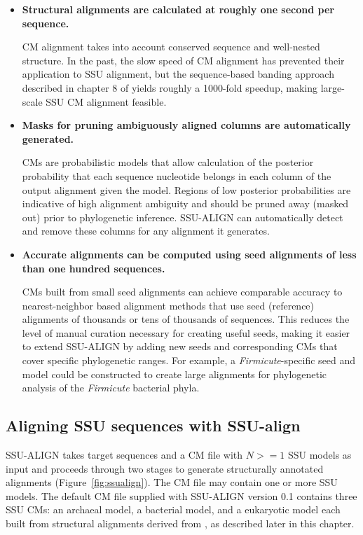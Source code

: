 \begin{itemize}

\item \textbf{Structural alignments are calculated at roughly one
  second per sequence.}  

  CM alignment takes into account conserved sequence and well-nested
  structure. In the past, the slow speed of CM alignment has prevented
  their application to SSU alignment, but the sequence-based banding
  approach described in chapter 8 of \cite{Nawrocki09b} yields roughly a 1000-fold speedup,
  making large-scale SSU CM alignment feasible.

\item \textbf{Masks for pruning ambiguously aligned columns are
  automatically generated.}
  
  CMs are probabilistic models that allow calculation of the posterior
  probability that each sequence nucleotide belongs in each column of the
  output alignment given the model. Regions of low posterior
  probabilities are indicative of high alignment ambiguity and
  should be pruned away (masked out) prior to phylogenetic
  inference. SSU-ALIGN can automatically detect and remove
  these columns for any alignment it generates.

\item \textbf{Accurate alignments can be computed using seed
  alignments of less than one hundred sequences.}

  CMs built from small seed alignments %
  can achieve comparable accuracy to nearest-neighbor based alignment
  methods that use seed (reference) alignments of thousands or tens of
  thousands of sequences. This reduces the level of manual curation
  necessary for creating useful seeds, making it easier to extend
  SSU-ALIGN by adding new seeds and corresponding CMs that cover
  specific phylogenetic ranges. For example, a
  \emph{Firmicute}-specific seed and model could be constructed to
  create large alignments for phylogenetic analysis of the \emph{Firmicute}
  bacterial phyla.

\end{itemize}

\subsection{Aligning SSU sequences with SSU-align}

SSU-ALIGN takes target sequences and a CM file with $N >=
1$ SSU models as input and proceeds through two stages to generate
structurally annotated alignments (Figure~\ref{fig:ssualign}).  The CM
file
may contain one or more SSU models. The default CM file supplied with
SSU-ALIGN version 0.1 contains three SSU CMs: an archaeal model,
a bacterial model, and a eukaryotic model each
built from structural alignments derived from 
\cite{CannoneGutell02}, as described later in this chapter. 

